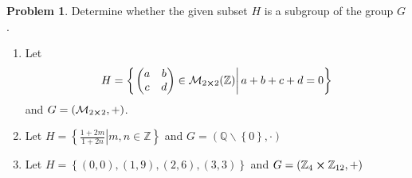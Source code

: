 \documentclass[10pt]{article}
\theoremstyle{definition}
\newtheorem{problem}{Problem}
\begin{document}
\begin{problem}
Determine whether the given subset $H$ is a subgroup of the group
$G$.
\begin{enumerate}[label=(\alph*)]
  \item Let
        $$H=\left\{\left.\begin{pmatrix}
            a & b \\
            c & d
          \end{pmatrix}\in\mathcal{M}_{2\cross 2}(\mathbb{Z})\right| a+b+c+d=0\right\}$$
        and $G=\left(\mathcal{M}_{2\cross 2}, +\right)$.
  \item Let $H=\left\{\left.\frac{1+2m}{1+2n}\right|m,n\in \mathbb{Z} \right\}$ and $G=\left(\mathbb{Q}\backslash \left\{0\right\},\cdot\right)$
  \item Let $H=\left\{(0,0),(1,9),(2,6),(3,3)\right\}$ and $G=\left(\mathbb{Z}_4\cross\mathbb{Z}_{12},+\right)$
\end{enumerate}
\end{problem}
\end{document}
